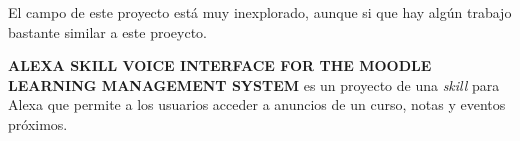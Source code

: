 
El campo de este proyecto está muy inexplorado, aunque si que hay algún trabajo bastante similar a este proeycto.

\textbf{ALEXA SKILL VOICE INTERFACE FOR THE MOODLE LEARNING MANAGEMENT SYSTEM}\cite{meltonALEXASKILLVOICE} es un proyecto de una \textit{skill} para Alexa que permite a los usuarios acceder a anuncios de un curso, notas y eventos próximos.
